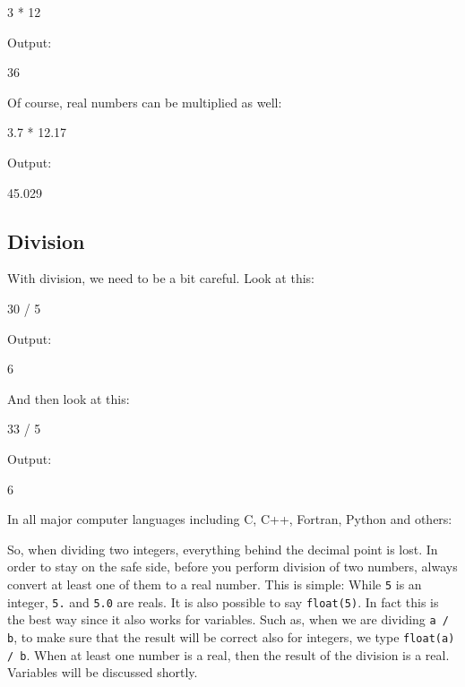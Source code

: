\begin{bluecode}
3 * 12
\end{bluecode}
Output:

\begin{bluecode}
36
\end{bluecode}
Of course, real numbers can be multiplied as well:

\begin{bluecode}
3.7 * 12.17
\end{bluecode}
Output:

\begin{bluecode}
45.029
\end{bluecode}
\subsection{Division}
With division, we need to be a bit careful. Look at this:

\begin{bluecode}
30 / 5
\end{bluecode}
Output:

\begin{bluecode}
6
\end{bluecode}
And then look at this:

\begin{bluecode}
33 / 5
\end{bluecode}
Output:

\begin{bluecode}
6
\end{bluecode}
In all major computer languages including C, C++, Fortran, Python and 
others:\\

\begin{center}
\end{center}

\vspace{4mm}
\noindent
So, when dividing two integers, everything behind the decimal point is lost.
In order to stay on the safe side, 
before you perform division of two numbers, always convert at least one of them
to a real number. This is simple: While {\tt 5} is an integer, {\tt 5.}
and {\tt 5.0} are reals. It is also possible to 
say {\tt float(5)}. In fact this is the best way since it also works for 
variables. Such as, when we are dividing {\tt a / b}, to make sure that 
the result will be correct also for integers, we type {\tt float(a) / b}. 
When at least one number is a real, then the result of the division is a real.   
Variables will be discussed shortly.

